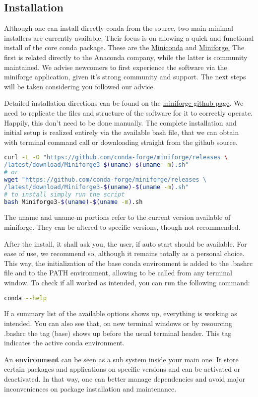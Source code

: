 \documentclass[a4paper,11pt]{article}
\begin{document}
\subsection{Installation}
Although one can install directly conda from the source, two main minimal
installers are currently available. Their focus is on allowing a quick and
functional install of the core conda package. These are the
\href{https://www.anaconda.com/docs/getting-started/miniconda/main}{Miniconda}
and \href{https://conda-forge.org/download/}{Miniforge.} The first is related
directly to the Anaconda company, while the latter is community maintained. We
advise newcomers to first experience the software via the miniforge application,
given it's strong community and support. The next steps will be taken
considering you followed our advice.\par
Detailed installation directions can be found on the
\href{https://github.com/conda-forge/miniforge}{miniforge github page}.
We need to replicate the files and structure of the software for it to correctly
operate. Happily, this don't need to be done manually. The complete installation
and initial setup is realized entirely via the available bash file, that we can
obtain with terminal command call or downloading straight from the github
source.
\begin{lstlisting}[language=bash]
curl -L -O "https://github.com/conda-forge/miniforge/releases \
/latest/download/Miniforge3-$(uname)-$(uname -m).sh"
# or
wget "https://github.com/conda-forge/miniforge/releases \ 
/latest/download/Miniforge3-$(uname)-$(uname -m).sh"
# to install simply run the script
bash Miniforge3-$(uname)-$(uname -m).sh
\end{lstlisting}
\begin{remarkbox}
The uname and uname-m portions refer to the current version available of
miniforge. They can be altered to specific versions, though not recommended.
\end{remarkbox}
After the install, it shall ask you, the user, if auto start should be
available. For ease of use, we recommend so, although it remains totally as
a personal choice. This way, the initialization of the base conda environment is
added to the .bashrc file and to the PATH environment, allowing to be called
from any terminal window. To check if all worked as intended, you can run the
following command:
\begin{lstlisting}[language=bash]
conda --help
\end{lstlisting}
If a summary list of the available options shows up, everything is working as
intended. You can also see that, on new terminal windows or by resourcing
.bashrc the tag (base) shows up before the usual terminal header. This tag
indicates the active conda environment. 
\begin{definitionbox}
    An \textbf{environment} can be seen as a sub system inside your main one. It
    store certain packages and applications on specific versions and can be
    activated or deactivated. In that way, one can better manage dependencies
    and avoid major inconveniences on package installation and maintenance.
\end{definitionbox}
\end{document}
